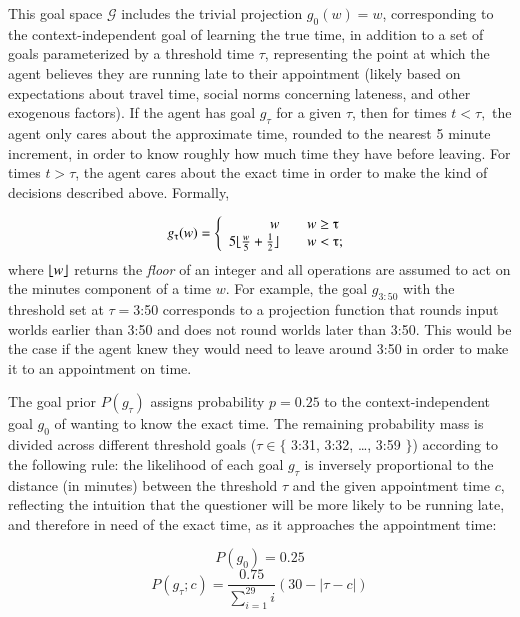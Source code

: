 \documentclass[12pt, floatsintext, jou]{apa6}
\begin{document}
This goal space $\mathcal{G}$ includes the trivial projection $g_0(w) = w$, corresponding to the context-independent goal of learning the true time, in addition to a set of goals parameterized by a threshold time $\tau$, representing the point at which the agent believes they are running late to their appointment (likely based on expectations about travel time, social norms concerning lateness, and other exogenous factors). If the agent has goal $g_\tau$ for a given $\tau$, then for times $t < \tau,$ the agent only cares about the approximate time, rounded to the nearest 5 minute increment, in order to know roughly how much time they have before leaving. For times $t > \tau$, the agent cares about the exact time in order to make the kind of decisions described above. Formally,

\DeclarePairedDelimiter{\floor}{\lfloor}{\rfloor}

$$g_\tau(w) = \left\{
\begin{array}{rcl}
w & & w \ge \tau\\
5\floor{\frac{w}{5} + \frac{1}{2}} & & w < \tau;  \\
\end{array}
\right.
$$
where $\floor{w}$ returns the \emph{floor} of an integer and all operations are assumed to act on the minutes component of a time $w$. For example, the goal $g_{3:50}$ with the threshold set at $\tau = $3:50 corresponds to a projection function that rounds input worlds earlier than 3:50 and does not round worlds later than 3:50. This would be the case if the agent knew they would need to leave around 3:50 in order to make it to an appointment on time. 

The goal prior $P(g_\tau)$ assigns probability $p=0.25$ to the context-independent goal $g_0$ of wanting to know the exact time. The remaining probability mass is divided across different threshold goals ($\tau \in \{$ 3:31, 3:32, \dots, 3:59 $\}$) according to the following rule: the likelihood of each goal $g_\tau$ is inversely proportional to the distance (in minutes) between the threshold $\tau$ and the given appointment time $c$, reflecting the intuition that the questioner will be more likely to be running late, and therefore in need of the exact time, as it approaches the appointment time:

$$P(g_0) = 0.25$$
$$P(g_\tau; c) = \frac{0.75}{\sum_{i=1}^{29}i}(30 - |\tau - c|)$$
\end{document}
